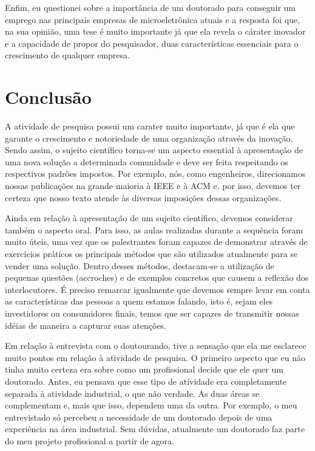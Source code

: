 \documentclass{article}
\begin{document}
Enfim, eu questionei sobre a importância de um doutorado para conseguir um
emprego nas principais empresas de microeletrônica atuais e a resposta foi que,
na sua opinião, uma tese é muito importante já que ela revela o cárater inovador
e a capacidade de propor do pesquisador, duas características essenciais para o
crescimento de qualquer empresa.

\section{Conclusão}

A atividade de pesquisa possui um carater muito importante, já que é ela que
garante o crescimento e notoriedade de uma organização através da inovação.
Sendo assim, o sujeito científico torna-se um aspecto essential à apresentação
de uma nova solução a determinada comunidade e deve ser feita respeitando
os respectivos padrões impostos. Por exemplo, nós, como engenheiros,
direcionamos nossas publicações na grande maioria à IEEE e à ACM e, por isso,
devemos ter certeza que nosso texto atende às diversas imposições dessas
organizações. 

\vspace{12pt}

Ainda em relação à apresentação de um sujeito científico, devemos considerar
também o aspecto oral. Para isso, as aulas realizadas durante a sequência foram
muito úteis, uma vez que os palestrantes foram capazes de demonstrar através de
exercícios práticos os principais métodos que são utilizados atualmente para se
vender uma solução. Dentro desses métodos, destacam-se a utilização de pequenas
questões (accroches) e de exemplos concretos que causem a reflexão dos
interlocutores. É preciso remarcar igualmente que devemos sempre levar em conta
as características das pessoas a quem estamos falando, isto é, sejam eles
investidores ou consumidores finais, temos que ser capazes de transmitir nossas
idéias de maneira a capturar suas atenções.

\vspace{12pt}

Em relação à entrevista com o doutourando, tive a sensação que ela me esclarece
muito pontos em relação à atividade de pesquisa. O primeiro aspecto que eu não
tinha muito certeza era sobre como um profissional decide que ele quer um
doutorado. Antes, eu pensava que esse tipo de atividade era completamente
separada à atividade industrial, o que não verdade. As duas áreas se
complementam e, mais que isso, dependem uma da outra. Por exemplo, o meu
entrevistado só percebeu a necessidade de um doutorado depois de uma experiência na área
industrial. Sem dúvidas, atualmente um doutorado faz parte do meu projeto
profissional a partir de agora.
\end{document}
